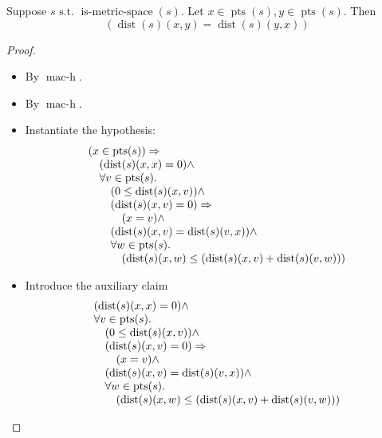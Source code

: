 \begin{proposition}
Suppose $s \text{ s.t. } \operatorname{is\text{-}metric\text{-}space}(s)$. Let $x \in \operatorname{pts}(s), y \in \operatorname{pts}(s)$. Then
\begin{equation*}
(\operatorname{dist}(s)(x, y) = \operatorname{dist}(s)(y, x))
\end{equation*}

\end{proposition}

\begin{proof}
\begin{itemize}
  \item[\textbf{3}] By $\operatorname{mac\text{-}h}$.
  \item[\textbf{4--7}] By $\operatorname{mac\text{-}h}$.
  \item[\textbf{8--9}] Instantiate the hypothesis:
\begin{equation*}
\begin{array}{@{}l@{}} (x \in \operatorname{pts}(s)) \Rightarrow  \\ \quad (\operatorname{dist}(s)(x, x) = 0) \wedge \\ \quad \forall v \in \operatorname{pts}(s). \\ \quad \quad (0 \leq \operatorname{dist}(s)(x, v)) \wedge \\ \quad \quad (\operatorname{dist}(s)(x, v) = 0) \Rightarrow  \\ \quad \quad \quad (x = v) \wedge \\ \quad \quad (\operatorname{dist}(s)(x, v) = \operatorname{dist}(s)(v, x)) \wedge \\ \quad \quad \forall w \in \operatorname{pts}(s). \\ \quad \quad \quad (\operatorname{dist}(s)(x, w) \leq (\operatorname{dist}(s)(x, v) + \operatorname{dist}(s)(v, w))) \end{array}
\end{equation*}

  \item[\textbf{10}] Introduce the auxiliary claim
\begin{equation*}
\begin{array}{@{}l@{}} (\operatorname{dist}(s)(x, x) = 0) \wedge \\ \forall v \in \operatorname{pts}(s). \\ \quad (0 \leq \operatorname{dist}(s)(x, v)) \wedge \\ \quad (\operatorname{dist}(s)(x, v) = 0) \Rightarrow  \\ \quad \quad (x = v) \wedge \\ \quad (\operatorname{dist}(s)(x, v) = \operatorname{dist}(s)(v, x)) \wedge \\ \quad \forall w \in \operatorname{pts}(s). \\ \quad \quad (\operatorname{dist}(s)(x, w) \leq (\operatorname{dist}(s)(x, v) + \operatorname{dist}(s)(v, w))) \end{array}
\end{equation*}


\end{itemize}
\end{proof}
